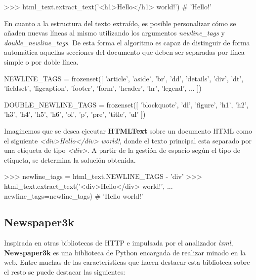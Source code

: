 \begin{Schunk}
  \begin{Soutput}
    >>> html_text.extract_text('<h1>Hello</h1> world!')
    # 'Hello\n\nworld!'
  \end{Soutput}
\end{Schunk}

En cuanto a la estructura del texto extraído, es posible personalizar cómo se añaden nuevas líneas al mismo
utilizando los argumentos \emph{newline\_tags} y \emph{double\_newline\_tags}. De esta forma el algoritmo 
es capaz de distinguir de forma automática aquellas secciones del documento que deben ser separadas por 
línea simple o por doble línea.

\begin{Schunk}
  \begin{Soutput}
    NEWLINE_TAGS = frozenset([
      'article', 'aside', 'br', 'dd', 'details', 'div', 'dt', 'fieldset',
      'figcaption', 'footer', 'form', 'header', 'hr', 'legend', ...
    ])

    DOUBLE_NEWLINE_TAGS = frozenset([
      'blockquote', 'dl', 'figure', 'h1', 'h2', 'h3', 'h4', 'h5', 'h6', 'ol',
      'p', 'pre', 'title', 'ul'
    ])
  \end{Soutput}
\end{Schunk}

Imaginemos que se desea ejecutar \textbf{HTMLText} sobre un documento HTML como el siguiente
\emph{<div>Hello</div> world!}, donde el texto principal esta separado por una etiqueta de tipo \emph{<div>}.
A partir de la gestión de espacio según el tipo de etiqueta, se determina la solución obtenida.

\begin{Schunk}
  \begin{Soutput}
    >>> newline_tags = html_text.NEWLINE_TAGS - {'div'}
    >>> html_text.extract_text('<div>Hello</div> world!',
    ...                        newline_tags=newline_tags)
    # 'Hello world!'
  \end{Soutput}
\end{Schunk}

\subsection{Newspaper3k}
\label{subsec:newspaper3k}

Inspirada en otras bibliotecas de HTTP e impulsada por el analizador \emph{lxml}, \textbf{Newspaper3k}
\cite{newspaper3k} es una biblioteca de Python encargada de realizar minado en la web. Entre muchas de las
características que hacen destacar esta biblioteca sobre el resto se puede destacar las siguientes:


